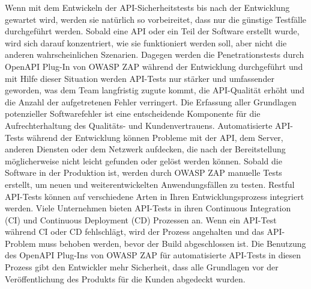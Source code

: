 Wenn mit dem Entwickeln der API-Sicherheitstests bis nach der Entwicklung gewartet wird, werden sie natürlich so vorbeireitet, dass nur die günstige Testfälle durchgeführt werden. Sobald eine API oder ein Teil der Software erstellt wurde, wird sich darauf konzentriert, wie sie funktioniert werden soll, aber nicht die anderen wahrscheinlichen Szenarien. Dagegen werden die Penetrationstests durch OpenAPI Plug-In von OWASP ZAP während der Entwicklung durchgeführt und mit Hilfe dieser Situation werden API-Tests nur stärker und umfassender geworden, was dem Team langfristig zugute kommt, die API-Qualität erhöht und die Anzahl der aufgetretenen Fehler verringert. Die Erfassung aller Grundlagen potenzieller Softwarefehler ist eine entscheidende Komponente für die Aufrechterhaltung des Qualitäts- und Kundenvertrauens. Automatisierte API-Tests während der Entwicklung können Probleme mit der API, dem Server, anderen Diensten oder dem Netzwerk aufdecken, die nach der Bereitstellung möglicherweise nicht leicht gefunden oder gelöst werden können. Sobald die Software in der Produktion ist, werden durch OWASP ZAP manuelle Tests erstellt, um neuen und weiterentwickelten Anwendungsfällen zu testen. Restful API-Tests können auf verschiedene Arten in Ihren Entwicklungsprozess integriert werden. Viele Unternehmen bieten API-Tests in ihren Continuous Integration (CI) und Continuous Deployment (CD) Prozessen an. Wenn ein API-Test während CI oder CD fehlschlägt, wird der Prozess angehalten und das API-Problem muss behoben werden, bevor der Build abgeschlossen ist. Die Benutzung des OpenAPI Plug-Ins von OWASP ZAP für automatisierte API-Tests in diesen Prozess gibt den Entwickler mehr Sicherheit, dass alle Grundlagen vor der Veröffentlichung des Produkts für die Kunden abgedeckt wurden\cite{restcaseapiimportance16}.
